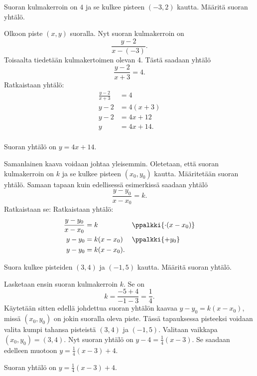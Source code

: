 \begin{esimerkki}
Suoran kulmakerroin on $4$ ja se kulkee pisteen $(-3,2)$ kautta. Määritä suoran yhtälö.

\begin{esimratk}
Olkoon piste $(x,y)$ suoralla. Nyt suoran kulmakerroin on 
\[
\frac{y-2}{x-(-3)}.
\]
Toisaalta tiedetään kulmakertoimen olevan 4. Tästä saadaan yhtälö
\[
\frac{y-2}{x+3}=4.
\]
Ratkaistaan yhtälö:
\begin{align*}
\frac{y-2}{x+3}&=4 \\
y-2&=4(x+3) \\
y-2&=4x+12 \\
y&=4x+14. \\
\end{align*}
\end{esimratk}

\begin{esimvast}
Suoran yhtälö on $y=4x+14$.
\end{esimvast}
\end{esimerkki}

Samanlainen kaava voidaan johtaa yleisemmin. Oletetaan, että suoran kulmakerroin on $k$ ja se kulkee pisteen $(x_0,y_0)$ kautta. Määritetään suoran yhtälö.
Samaan tapaan kuin edellisessä esimerkissä saadaan yhtälö
\[
\frac{y-y_0}{x-x_0}=k.
\]
Ratkaistaan se:
Ratkaistaan yhtälö:
\begin{align*}
\frac{y-y_0}{x-x_0}&=k && \ppalkki{\cdot (x-x_0)}\\
y-y_0&=k(x-x_0) && \ppalkki{+y_0} \\
y-y_0&=k(x-x_0). &&
\end{align*}


\begin{esimerkki}
Suora kulkee pisteiden $(3,4)$ ja $(-1,5)$ kautta. Määritä suoran yhtälö.

\begin{esimratk}
Lasketaan ensin suoran kulmakerroin $k$. Se on
\[
k=\frac{-5+4}{-1-3}=\frac{1}{4}.
\]
Käytetään sitten edellä johdettua suoran yhtälön kaavaa $y-y_0=k(x-x_0)$, missä $(x_0,y_0)$ on jokin suoralla oleva piste. Tässä tapauksessa pisteeksi voidaan valita kumpi tahansa pisteistä $(3,4)$ ja $(-1,5)$.
Valitaan vaikkapa $(x_0,y_0)=(3,4)$. Nyt suoran yhtälö on $y-4=\frac{1}{4}(x-3)$. Se saadaan edelleen muotoon $y=\frac{1}{4}(x-3)+4$.
\end{esimratk}
\begin{esimvast}
Suoran yhtälö on $y=\frac{1}{4}(x-3)+4$.
\end{esimvast}
\end{esimerkki}

